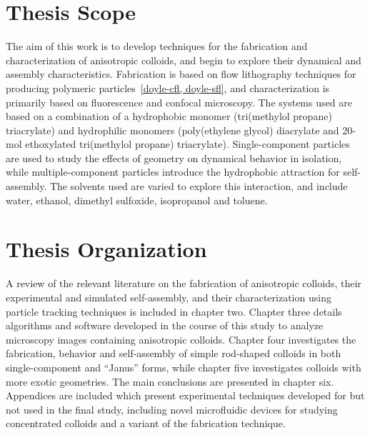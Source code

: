 \section{Thesis Scope}

The aim of this work is to develop techniques for the fabrication and characterization of anisotropic colloids, and begin
to explore their dynamical and assembly characteristics.  Fabrication is based on flow lithography
techniques for producing polymeric particles~\ref{doyle-cfl, doyle-sfl}, 
and characterization is primarily based on fluorescence and confocal microscopy.
The systems used are based on a combination of a hydrophobic monomer (tri(methylol propane) triacrylate) and hydrophilic 
monomers (poly(ethylene glycol) diacrylate and 20-mol ethoxylated tri(methylol propane) triacrylate). 
Single-component particles are used to study the effects of
geometry on dynamical behavior in isolation, while multiple-component particles introduce 
the hydrophobic attraction for self-assembly.  The solvents used are 
varied to explore this interaction, and include
water, ethanol, dimethyl sulfoxide, isopropanol and toluene.

\section{Thesis Organization}

A review of the relevant literature on the fabrication of anisotropic colloids, their experimental and simulated
self-assembly, and their characterization using particle tracking techniques is included in chapter two.  Chapter three
details algorithms and software developed in the course of this study to analyze microscopy images containing 
anisotropic colloids.  Chapter four investigates the fabrication, behavior and self-assembly of simple rod-shaped colloids
in both single-component and ``Janus'' forms, while chapter five investigates colloids with more exotic geometries. The main
conclusions are presented in chapter six.  Appendices are included which present experimental techniques developed for but not used
in the final study, including novel microfluidic devices for studying concentrated colloids and a variant of the fabrication
technique.
